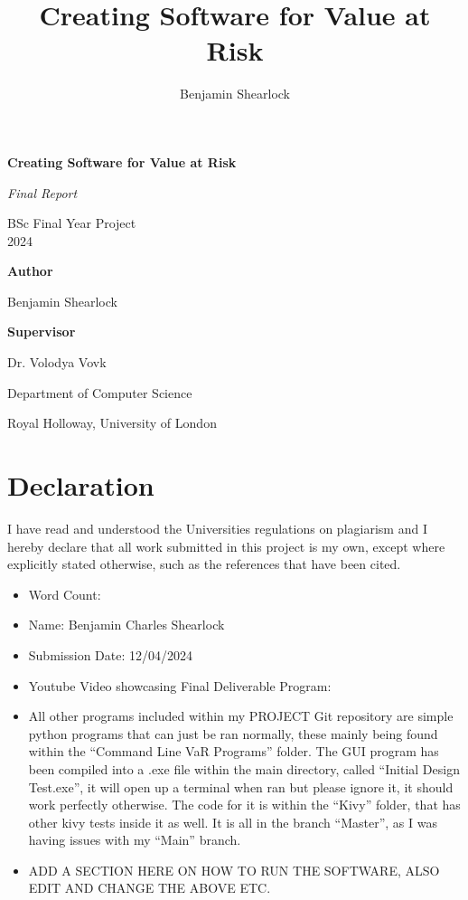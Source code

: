 \documentclass{article}
\title{Creating Software for Value at Risk}
\author{Benjamin Shearlock}
\begin{document}
\raggedright

\begin{titlepage}
  \begin{center}
    \vspace*{1cm}
    {\LARGE \textbf{Creating Software for Value at Risk} \par} 
    \vspace{1.5cm}
    {\Large \textit{Final Report} \par}
    \vspace{0.5cm}
    {\Large BSc Final Year Project \\ 2024 \par}
    \vspace{2cm}
    {\large \textbf{Author} \par}
    {\large Benjamin Shearlock \par}
    \vspace{2cm}
    {\large \textbf{Supervisor} \par}
    {\large Dr. Volodya Vovk \par}
    \vfill
    {\large Department of Computer Science \par}
    {\large Royal Holloway, University of London \par}
  \end{center}
\end{titlepage}

\setlength{\parindent}{0pt}

\section*{Declaration}
I have read and understood the Universities regulations on plagiarism and I hereby declare that all work submitted in this project is my own, except where explicitly stated otherwise, such as the references that have been cited. \\

\begin{itemize}
  \item Word Count:
  \item Name: Benjamin Charles Shearlock
  \item Submission Date: 12/04/2024
  \item Youtube Video showcasing Final Deliverable Program: \url{}
  \item All other programs included within my PROJECT Git repository are simple python programs that can just be ran normally, these mainly being found within the ``Command Line VaR Programs'' folder. The GUI program has been compiled into a .exe file within the main directory, called “Initial Design Test.exe”, it will open up a terminal when ran but please ignore it, it should work perfectly otherwise. The code for it is within the ``Kivy'' folder, that has other kivy tests inside it as well. It is all in the branch ``Master'', as I was having issues with my ``Main'' branch.
  \item ADD A SECTION HERE ON HOW TO RUN THE SOFTWARE, ALSO EDIT AND CHANGE THE ABOVE ETC.

\end{itemize}
\end{document}
